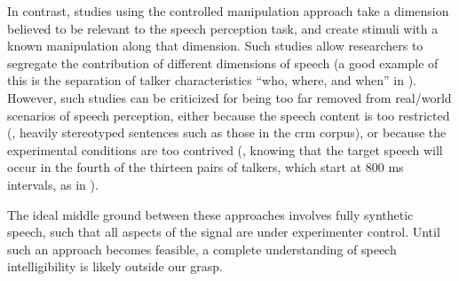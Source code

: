 In contrast, studies using the controlled manipulation approach take a dimension believed to be relevant to the speech perception task, and create stimuli with a known manipulation along that dimension.\footnotemark{}  Such studies allow researchers to segregate the contribution of different dimensions of speech (a good example of this is the separation of talker characteristics “who, where, and when” in \citealt{KitterickEtAl2010}).  However, such studies can be criticized for being too far removed from real\-/world scenarios of speech perception, either because the speech content is too restricted (\ie, heavily stereotyped sentences such as those in the \ac{crm} corpus), or because the experimental conditions are too contrived (\eg, knowing that the target speech will occur in the fourth of the thirteen pairs of talkers, which start at 800 ms intervals, as in \citealt{KitterickEtAl2010}).

The ideal middle ground between these approaches involves fully synthetic speech, such that all aspects of the signal are under experimenter control.  Until such an approach becomes feasible, a complete understanding of speech intelligibility is likely outside our grasp. 



